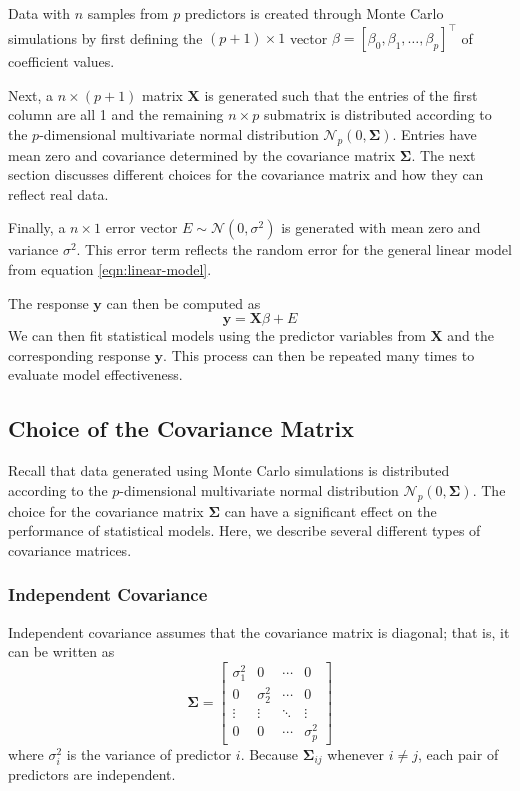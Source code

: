 \documentclass{article}
\begin{document}
Data with $n$ samples from $p$ predictors is created through Monte Carlo simulations by first defining the $(p + 1)\times 1$ vector $\beta = [\beta_0, \beta_1, \dotsc, \beta_p]^\top$ of coefficient values.

Next, a $n\times(p + 1)$ matrix $\mathbf{X}$ is generated such that the entries of the first column are all 1 and the remaining $n\times p$ submatrix is distributed according to the $p$-dimensional multivariate normal distribution $\mathcal{N}_p(0, \mathbf{\Sigma})$. Entries have mean zero and covariance determined by the covariance matrix $\mathbf{\Sigma}$. The next section discusses different choices for the covariance matrix and how they can reflect real data.

Finally, a $n\times 1$ error vector $E\sim \mathcal{N}(0, \sigma^2)$ is generated with mean zero and variance $\sigma^2$. This error term reflects the random error for the general linear model from equation \ref{eqn:linear-model}.

The response $\mathbf{y}$ can then be computed as
\begin{equation}
	\mathbf{y}=\mathbf{X}\beta + E
\end{equation}
We can then fit statistical models using the predictor variables from $\mathbf{X}$ and the corresponding response $\mathbf{y}$. This process can then be repeated many times to evaluate model effectiveness.

\subsection{Choice of the Covariance Matrix}
Recall that data generated using Monte Carlo simulations is distributed according to the $p$-dimensional multivariate normal distribution $\mathcal{N}_p(0, \mathbf{\Sigma})$. The choice for the covariance matrix $\mathbf{\Sigma}$ can have a significant effect on the performance of statistical models. Here, we describe several different types of covariance matrices.

\subsubsection{Independent Covariance}
Independent covariance assumes that the covariance matrix is diagonal; that is, it can be written as
\begin{equation}
	\mathbf{\Sigma} = \begin{bmatrix}
		\sigma_1^2 & 0 & \cdots & 0\\
		0 & \sigma_2^2 & \cdots & 0\\
		\vdots & \vdots & \ddots & \vdots\\
		0 & 0 & \cdots & \sigma_p^2
	\end{bmatrix}
\end{equation}
where $\sigma_i^2$ is the variance of predictor $i$. Because $\mathbf{\Sigma}_{ij}$ whenever $i\neq j$, each pair of predictors are independent.
\end{document}
